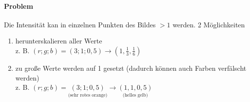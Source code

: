 \paragraph*{Problem} Die Intensität kan in einzelnen Punkten des Bildes $> 1$ werden.
2 Möglichkeiten
\begin{enumerate}
 \item herunterskalieren aller Werte\\
	z. B. $(r;g;b) = (3;1;0{,}5) \to \left(1,\frac{1}{3},\frac{1}{6}\right)$
 \item zu große Werte werden auf 1 gesetzt (dadurch können auch Farben verfälscht werden)\\
	z. B. $(r;g;b) = \underset{\text{(sehr rotes orange)}}{(3;1;0{,}5)} \to \underset{\text{(helles gelb)}}{(1,1,0{,}5)}$
\end{enumerate}

